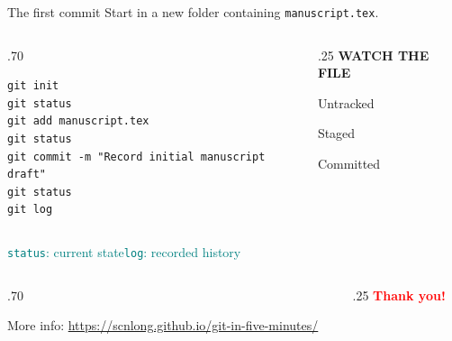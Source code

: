 \documentclass[aspectratio=169]{beamer}
\newcommand{\labeltext}[1]{{\color{Teal}\fontsize{13}{17}\selectfont\bfseries #1}}
\newcommand{\smalltext}[1]{{\fontsize{18}{24}\selectfont #1}}
\begin{document}
\begin{frame}[t,fragile]{The first commit}
\smalltext{Start in a new folder containing \texttt{manuscript.tex}.}\par
\vspace{8mm}
\begin{columns}[T,onlytextwidth]
\begin{column}{.70\textwidth}
\begin{lstlisting}
git init
git status
git add manuscript.tex
git status
git commit -m "Record initial manuscript draft"
git status
git log
\end{lstlisting}
\end{column}
\begin{column}{.25\textwidth}
\labeltext{WATCH THE FILE}\par\vspace{6mm}
\smalltext{Untracked\par\vspace{6mm}Staged\par\vspace{6mm}Committed}
\end{column}
\end{columns}
\vfill
\smalltext{\textcolor{Teal}{\texttt{status}: current state\hspace{12mm}\texttt{log}: recorded history}}\par
\vspace{6mm}
\begin{columns}[T,onlytextwidth]
\begin{column}{.70\textwidth}
\smalltext{More info: \url{https://scnlong.github.io/git-in-five-minutes/}\par}
\end{column}
\begin{column}{.25\textwidth}
\labeltext{\textcolor{red}{\LARGE{Thank you!}}}\par\vspace{6mm}
\end{column}
\end{columns}
\end{frame}
\end{document}
